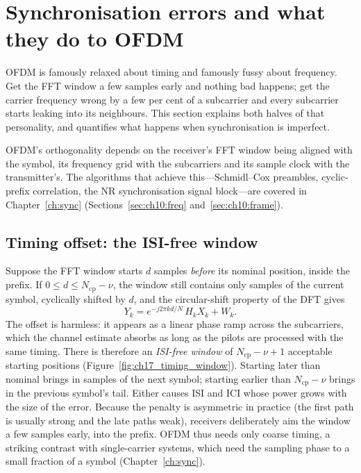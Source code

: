 
\section{Synchronisation errors and what they do to OFDM}
\label{sec:ch17:sync}

OFDM is famously relaxed about timing and famously fussy about frequency. Get the FFT window a
few samples early and nothing bad happens; get the carrier frequency wrong by a few per cent of a
subcarrier and every subcarrier starts leaking into its neighbours. This section explains both
halves of that personality, and quantifies what happens when synchronisation is imperfect.

OFDM's orthogonality depends on the receiver's FFT window being aligned with the symbol, its
frequency grid with the subcarriers and its sample clock with the transmitter's. The algorithms that
achieve this---Schmidl--Cox preambles, cyclic-prefix correlation, the NR synchronisation signal
block---are covered in Chapter~\ref{ch:sync} (Sections~\ref{sec:ch10:freq} and~\ref{sec:ch10:frame}).

\subsection{Timing offset: the ISI-free window}

Suppose the FFT window starts $d$ samples \emph{before} its nominal position, inside the prefix. If
$0\le d\le N_{\text{cp}}-\nu$, the window still contains only samples of the current symbol, cyclically
shifted by $d$, and the circular-shift property of the DFT gives
\begin{equation}
Y_k=e^{-j2\pi kd/N}\,H_kX_k+W_k.
\end{equation}
The offset is harmless: it appears as a linear phase ramp across the subcarriers, which the channel
estimate absorbs as long as the pilots are processed with the same timing. There is therefore an
\emph{ISI-free window} of $N_{\text{cp}}-\nu+1$ acceptable starting positions (Figure~\ref{fig:ch17_timing_window}).
Starting later than nominal brings in samples of the next symbol; starting earlier than $N_{\text{cp}}-\nu$
brings in the previous symbol's tail. Either causes ISI and ICI whose power grows with the size of the
error. Because the penalty is asymmetric in practice (the first path is usually strong and the late
paths weak), receivers deliberately aim the window a few samples early, into the prefix. OFDM thus
needs only coarse timing, a striking contrast with single-carrier systems, which need the sampling phase
to a small fraction of a symbol (Chapter~\ref{ch:sync}).

